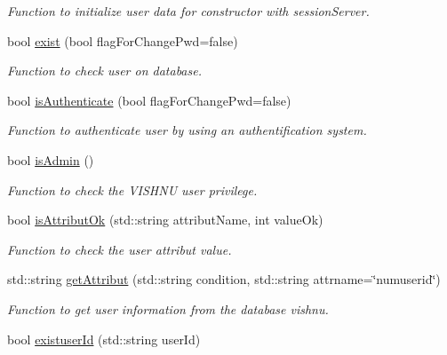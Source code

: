 \begin{DoxyCompactItemize}
\begin{DoxyCompactList}\small\item\em Function to initialize user data for constructor with sessionServer. \item\end{DoxyCompactList}\item 
bool \hyperlink{classUserServer_a26ccae7a3b8ee7e62e2224312119aece}{exist} (bool flagForChangePwd=false)
\begin{DoxyCompactList}\small\item\em Function to check user on database. \item\end{DoxyCompactList}\item 
bool \hyperlink{classUserServer_a42f6a347a80bcf6806c8f944f66cc713}{isAuthenticate} (bool flagForChangePwd=false)
\begin{DoxyCompactList}\small\item\em Function to authenticate user by using an authentification system. \item\end{DoxyCompactList}\item 
bool \hyperlink{classUserServer_a7dab9117c2ca5a706bb674e43b183255}{isAdmin} ()
\begin{DoxyCompactList}\small\item\em Function to check the VISHNU user privilege. \item\end{DoxyCompactList}\item 
bool \hyperlink{classUserServer_aecc5dd38cacf2460a187f6e751000c9a}{isAttributOk} (std::string attributName, int valueOk)
\begin{DoxyCompactList}\small\item\em Function to check the user attribut value. \item\end{DoxyCompactList}\item 
std::string \hyperlink{classUserServer_aaabcde0c694987b990a3ba1af445f718}{getAttribut} (std::string condition, std::string attrname=\char`\"{}numuserid\char`\"{})
\begin{DoxyCompactList}\small\item\em Function to get user information from the database vishnu. \item\end{DoxyCompactList}\item 
bool \hyperlink{classUserServer_ac61e9715aa922ad746ecd8f788130834}{existuserId} (std::string userId)

\end{DoxyCompactItemize}

